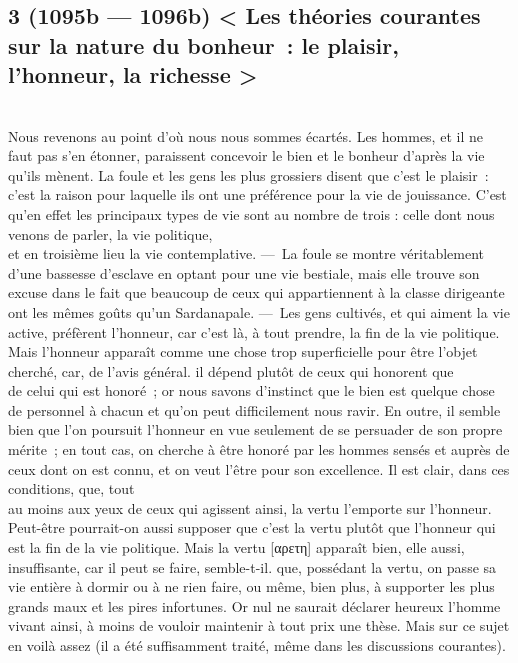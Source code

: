 \documentclass[french,twoside]{book} %
\begin{document}
\subsection[{3 (1095b — 1096b) < Les théories courantes sur la nature du bonheur : le plaisir, l’honneur, la richesse >}]{3 (1095b — 1096b) < Les théories courantes sur la nature du bonheur : le plaisir, l’honneur, la richesse >}
\noindent \\
Nous revenons au point d’où nous nous sommes écartés. Les hommes, et il ne faut pas s’en étonner, paraissent concevoir le bien et le bonheur d’après la vie qu’ils mènent. La foule et les gens les plus grossiers disent que c’est le plaisir : c’est la raison pour laquelle ils ont une préférence pour la vie de jouissance. C’est qu’en effet les principaux types de vie sont au nombre de trois : celle dont nous venons de parler, la vie politique, \\
et en troisième lieu la vie contemplative. — La foule se montre véritablement d’une bassesse d’esclave en optant pour une vie bestiale, mais elle trouve son excuse dans le fait que beaucoup de ceux qui appartiennent à la classe dirigeante ont les mêmes goûts qu’un Sardanapale. — Les gens cultivés, et qui aiment la vie active, préfèrent l’honneur, car c’est là, à tout prendre, la fin de la vie politique. Mais l’honneur apparaît comme une chose trop superficielle pour être l’objet cherché, car, de l’avis général. il dépend plutôt de ceux qui honorent que \\
de celui qui est honoré ; or nous savons d’instinct que le bien est quelque chose de personnel à chacun et qu’on peut difficilement nous ravir. En outre, il semble bien que l’on poursuit l’honneur en vue seulement de se persuader de son propre mérite ; en tout cas, on cherche à être honoré par les hommes sensés et auprès de ceux dont on est connu, et on veut l’être pour son excellence. Il est clair, dans ces conditions, que, tout \\
au moins aux yeux de ceux qui agissent ainsi, la vertu l’emporte sur l’honneur. Peut-être pourrait-on aussi supposer que c’est la vertu plutôt que l’honneur qui est la fin de la vie politique. Mais la vertu [αρετη] apparaît bien, elle aussi, insuffisante, car il peut se faire, semble-t-il. que, possédant la vertu, on  passe sa vie entière à dormir ou à ne rien faire, ou même, bien plus, à supporter les plus grands maux et les pires infortunes. Or nul ne saurait déclarer heureux l’homme vivant ainsi, à moins de vouloir maintenir à tout prix une thèse. Mais sur ce sujet en voilà assez (il a été suffisamment traité, même dans les discussions courantes).\par
\end{document}

